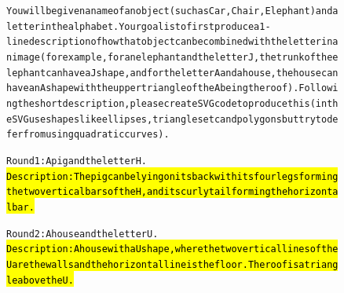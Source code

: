 \begin{figure}
\begin{AIbox}{\DV}\scriptsize\vspace{-5px}
\parbox{1\textwidth}{\begin{alltt}
You will be given a name of an object (such as Car, Chair, Elephant) and a letter in the alphabet. Your goal is to first produce a 1-line description of how that object can be combined with the letter in an image (for example, for an elephant and the letter J, the trunk of the elephant can have a J shape, and for the letter A and a house, the house can have an A shape with the upper triangle of the A being the roof). Following the short description, please create SVG code to produce this (in the SVG use shapes like ellipses, triangles etc and polygons but try to defer from using quadratic curves).
\end{alltt}}
\vspace{-15px} \tcbline \vspace{-20px}
\parbox[t]{0.8\textwidth}{
\begin{alltt}
Round 1: A pig and the letter H. \\
\hl{Description: The pig can be lying on its back with its four legs forming the two vertical bars of the H, and its curly tail forming the horizontal bar.}
\end{alltt}
}
%
\vspace{-15px} \tcbline \vspace{-20px}
\parbox[t]{0.8\textwidth}{
\begin{alltt}
Round 2: A house and the letter U. \\
\hl{Description: A house with a U shape, where the two vertical lines of the U are the walls and the horizontal line is the floor. The roof is a triangle above the U.}
\end{alltt}
}
%
\vspace{-10px} \tcbline \vspace{-20px}
\parbox[t]{0.8\textwidth}{
\begin{alltt}

\end{alltt}}
\end{AIbox}
\end{figure}
